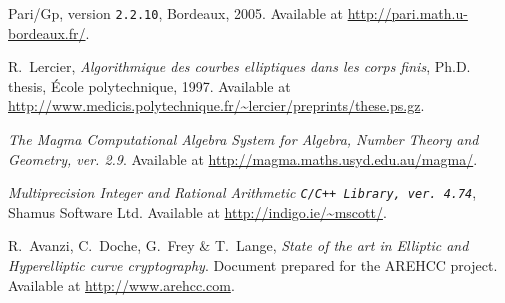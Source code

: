 \documentclass[11pt]{article}
\begin{document}
\begin{thebibliography}{99}

\def\urlprefix{{Available at }}

{\sc Pari/Gp}, version {\tt 2.2.10}, Bordeaux, 2005.
\urlprefix\url{http://pari.math.u-bordeaux.fr/}.

{\sc R.~Lercier}, \emph{{Algorithmique des courbes elliptiques dans les corps
  finis}}, Ph.D. thesis, \'Ecole polytechnique, 1997.
\urlprefix\url{http://www.medicis.polytechnique.fr/~lercier/preprints/these.ps.gz}.

\emph{{The Magma Computational Algebra System for Algebra, Number Theory and
  Geometry, ver. 2.9}}.
\urlprefix\url{http://magma.maths.usyd.edu.au/magma/}.

\emph{Multiprecision Integer and Rational Arithmetic \tt{C/C++} Library, ver.
4.74}, {Shamus Software Ltd}. \urlprefix\url{http://indigo.ie/~mscott/}.

{\sc R.~Avanzi}, {\sc C.~Doche}, {\sc G.~Frey} \& {\sc T.~Lange}, \emph{{State
  of the art in Elliptic and Hyperelliptic curve cryptography}}.
{Document prepared for the AREHCC project}.
\urlprefix\url{http://www.arehcc.com}.

\end{thebibliography}
\end{document}
